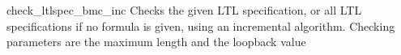 \begin{nusmvCommand} {check\_ltlspec\_bmc\_inc} {Checks the given LTL
specification, or all LTL specifications if no formula is given, 
using an incremental algorithm.
Checking parameters are the maximum length and the loopback value}
\begin{cmdOpt}
\end{cmdOpt}
\end{nusmvCommand}
